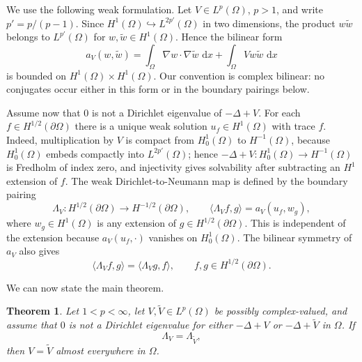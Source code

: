 \documentclass[a4paper,11pt]{article}
\newcommand{\dd}{\,\text{d}}
\theoremstyle{plain}
\newtheorem{thm}{Theorem}[section]
\theoremstyle{definition}
\theoremstyle{remark}
\begin{document}
We use the following weak formulation.  Let $V\in L^p(\Omega)$, $p>1$, and write $p'=p/(p-1)$.  Since $H^1(\Omega)\hookrightarrow L^{2p'}(\Omega)$ in two dimensions, the product $w\widetilde w$ belongs to $L^{p'}(\Omega)$ for $w,\widetilde w\in H^1(\Omega)$.  Hence the bilinear form
\begin{equation}\label{weak-form-def}
        a_V(w,\widetilde w)=\int_\Omega \nabla w\cdot\nabla \widetilde w\,\dd x+
        \int_\Omega Vw\widetilde w\,\dd x
\end{equation}
is bounded on $H^1(\Omega)\times H^1(\Omega)$.  Our convention is complex bilinear: no conjugates occur either in this form or in the boundary pairings below.

Assume now that $0$ is not a Dirichlet eigenvalue of $-\Delta+V$.  For each $f\in H^{1/2}(\partial\Omega)$ there is a unique weak solution $u_f\in H^1(\Omega)$ with trace $f$.  Indeed, multiplication by $V$ is compact from $H^1_0(\Omega)$ to $H^{-1}(\Omega)$, because $H^1_0(\Omega)$ embeds compactly into $L^{2p'}(\Omega)$; hence $-\Delta+V:H^1_0(\Omega)\to H^{-1}(\Omega)$ is Fredholm of index zero, and injectivity gives solvability after subtracting an $H^1$ extension of $f$.  The weak Dirichlet-to-Neumann map is defined by the boundary pairing
\begin{equation}\label{DN-space}
        \Lambda_V:H^{1/2}(\partial\Omega)\longrightarrow H^{-1/2}(\partial\Omega),
        \qquad
        \langle \Lambda_V f,g\rangle=a_V(u_f,w_g),
\end{equation}
where $w_g\in H^1(\Omega)$ is any extension of $g\in H^{1/2}(\partial\Omega)$.  This is independent of the extension because $a_V(u_f,\cdot)$ vanishes on $H^1_0(\Omega)$.  The bilinear symmetry of $a_V$ also gives
\begin{equation*}
        \langle \Lambda_V f,g\rangle=\langle \Lambda_V g,f\rangle,
        \qquad f,g\in H^{1/2}(\partial\Omega).
\end{equation*}

We can now state the main theorem.
\begin{thm}\label{main-thm}
Let $1<p<\infty$, let $V,\widetilde V\in L^p(\Omega)$ be possibly complex-valued, and assume that $0$ is not a Dirichlet eigenvalue for either $-\Delta+V$ or $-\Delta+\widetilde V$ in $\Omega$.  If
\begin{equation*}
        \Lambda_V=\Lambda_{\widetilde V},
\end{equation*}
then $V=\widetilde V$ almost everywhere in $\Omega$.
\end{thm}
\end{document}
